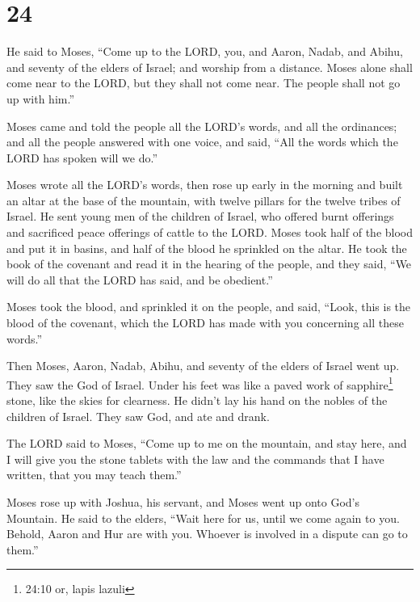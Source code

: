 \hypertarget{section-23}{%
\section{24}\label{section-23}}

 He said to Moses, ``Come up to the LORD, you, and Aaron,
Nadab, and Abihu, and seventy of the elders of Israel; and worship from
a distance.  Moses alone shall come near to the LORD, but
they shall not come near. The people shall not go up with him.''

 Moses came and told the people all the LORD's words, and
all the ordinances; and all the people answered with one voice, and
said, ``All the words which the LORD has spoken will we do.''

 Moses wrote all the LORD's words, then rose up early in the
morning and built an altar at the base of the mountain, with twelve
pillars for the twelve tribes of Israel.  He sent young men
of the children of Israel, who offered burnt offerings and sacrificed
peace offerings of cattle to the LORD.  Moses took half of
the blood and put it in basins, and half of the blood he sprinkled on
the altar.  He took the book of the covenant and read it in
the hearing of the people, and they said, ``We will do all that the LORD
has said, and be obedient.''

 Moses took the blood, and sprinkled it on the people, and
said, ``Look, this is the blood of the covenant, which the LORD has made
with you concerning all these words.''

 Then Moses, Aaron, Nadab, Abihu, and seventy of the elders
of Israel went up.  They saw the God of Israel. Under his
feet was like a paved work of sapphire\footnote{24:10 or, lapis lazuli}
stone, like the skies for clearness.  He didn't lay his
hand on the nobles of the children of Israel. They saw God, and ate and
drank.

 The LORD said to Moses, ``Come up to me on the mountain,
and stay here, and I will give you the stone tablets with the law and
the commands that I have written, that you may teach them.''

 Moses rose up with Joshua, his servant, and Moses went up
onto God's Mountain.  He said to the elders, ``Wait here
for us, until we come again to you. Behold, Aaron and Hur are with you.
Whoever is involved in a dispute can go to them.''

